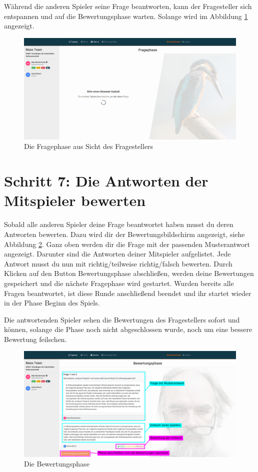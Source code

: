 \documentclass[a4paper,11pt,listof=numbered,glossary=totoc,parskip=half,toc=bib]{scrreprt}
\begin{document}
\begin{appendices}
	Während die anderen Spieler seine Frage beantworten, kann der Fragesteller sich entspannen und auf die Bewertungsphase warten. Solange wird im Abbildung \ref{fig:guide_fragephase_warten} angezeigt.
	
	\begin{figure}[h!]
		\centering
		\includegraphics[width=\textwidth]{UserGuide/Fragephase_warten.png}
		\caption{Die Fragephase aus Sicht des Fragestellers}
		\label{fig:guide_fragephase_warten}
	\end{figure}
	
	\newpage
	\section*{Schritt 7: Die Antworten der Mitspieler bewerten}
					
	Sobald alle anderen Spieler deine Frage beantwortet haben musst du deren Antworten bewerten. Dazu wird dir der Bewertungsbildschirm angezeigt, siehe Abbildung \ref{fig:guide_bewertungsphase}.
	Ganz oben werden dir die Frage mit der passenden Musterantwort angezeigt. Darunter sind die Antworten deiner Mitspieler aufgelistet. Jede Antwort musst du nun mit richtig/teilweise richtig/falsch bewerten. Durch Klicken auf den Button Bewertungsphase abschließen, werden deine Bewertungen gespeichert und die nächste Fragephase wird gestartet. Wurden bereits alle Fragen beantwortet, ist diese Runde anschließend beendet und ihr startet wieder in der Phase Beginn des Spiels.
	
	Die antwortenden Spieler sehen die Bewertungen des Fragestellers sofort und können, solange die Phase noch nicht abgeschlossen wurde, noch um eine bessere Bewertung feilschen.
	
	\begin{figure}[h!]
		\centering
		\includegraphics[width=\textwidth]{UserGuide/Bewertungsphase.png}
		\caption{Die Bewertungsphase}
		\label{fig:guide_bewertungsphase}
	\end{figure}
	

\end{appendices}
\end{document}
